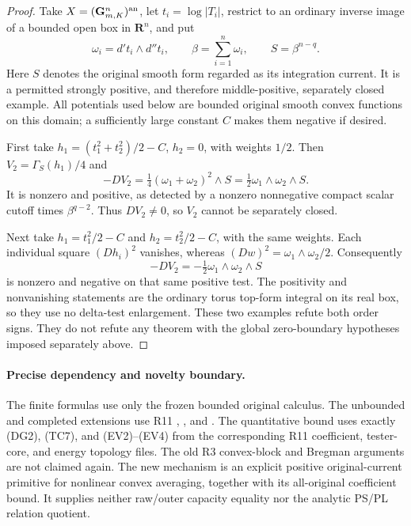 \documentclass[11pt,a4paper]{article}
\numberwithin{equation}{section}
\theoremstyle{definition}
\theoremstyle{remark}
\begin{document}
\begin{proof}
Take $X=(\mathbf G_{m,K}^n)^{\rm an}$, let
$t_i=\log|T_i|$, restrict to an ordinary inverse image of a bounded
open box in $\mathbf R^n$, and put
\[
 \omega_i=d't_i\wedge d''t_i,\qquad
 \beta=\sum_{i=1}^n\omega_i,\qquad S=\beta^{n-q}.
\]
Here $S$ denotes the original smooth form regarded as its integration
current.  It is a permitted strongly positive, and therefore
middle-positive, separately closed example.  All potentials used
below are bounded original smooth convex functions on this domain;
a sufficiently large constant $C$ makes them negative if desired.

First take $h_1=(t_1^2+t_2^2)/2-C$, $h_2=0$, with weights $1/2$.
Then $V_2=\Gamma_S(h_1)/4$ and
\[
             -DV_2=\tfrac14(\omega_1+\omega_2)^2\wedge S
                         =\tfrac12\omega_1\wedge\omega_2\wedge S.
 \tag{JD17}
\]
It is nonzero and positive, as detected by a nonzero nonnegative
compact scalar cutoff times $\beta^{q-2}$.  Thus $DV_2\ne0$, so
$V_2$ cannot be separately closed.

Next take $h_1=t_1^2/2-C$ and $h_2=t_2^2/2-C$, with the same weights.
Each individual square $(Dh_i)^2$ vanishes, whereas
$(Dw)^2=\omega_1\wedge\omega_2/2$.  Consequently
\[
                -DV_2=-\tfrac12\omega_1\wedge\omega_2\wedge S
 \tag{JD18}
\]
is nonzero and negative on that same positive test.  The positivity
and nonvanishing statements are the ordinary torus top-form integral
on its real box, so they use no delta-test enlargement.  These two
examples refute both order signs.  They do not refute any theorem
with the global zero-boundary hypotheses imposed separately above.
\end{proof}

\paragraph{Precise dependency and novelty boundary.}
The finite formulas use only the frozen bounded original calculus.
The unbounded and completed extensions use R11
,
, and
.
The quantitative bound uses exactly (DG2), (TC7), and (EV2)--(EV4)
from the corresponding R11 coefficient, tester-core, and energy
topology files.  The old R3 convex-block and Bregman arguments are
not claimed again.  The new mechanism is an explicit positive
original-current primitive for nonlinear convex averaging, together
with its all-original coefficient bound.  It supplies neither
raw/outer capacity equality nor the analytic PS/PL relation quotient.
\end{document}
